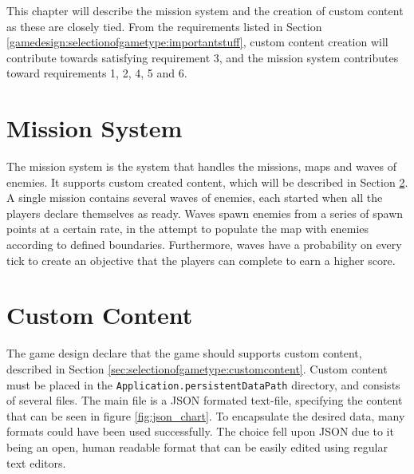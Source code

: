 This chapter will describe the mission system and the creation of custom content as these are closely tied.
From the requirements listed in Section \ref{gamedesign:selectionofgametype:importantstuff}, custom content creation will contribute towards satisfying requirement 3, and the mission system contributes toward requirements 1, 2, 4, 5 and 6.

\section{Mission System}
The mission system is the system that handles the missions, maps and waves of enemies.
It supports custom created content, which will be described in Section \ref{sec:modules:missions:customcontent}.
A single mission contains several waves of enemies, each started when all the players declare themselves as ready.
Waves spawn enemies from a series of spawn points at a certain rate, in the attempt to populate the map with enemies according to defined boundaries.
Furthermore, waves have a probability on every tick to create an objective that the players can complete to earn a higher score.

\section{Custom Content}\label{sec:modules:missions:customcontent}
The game design declare that the game should supports custom content, described in Section \ref{sec:selectionofgametype:customcontent}.
Custom content must be placed in the \lstinline|Application.persistentDataPath| directory, and consists of several files.
The main file is a JSON formated text-file, specifying the content that can be seen in figure \ref{fig:json_chart}.
To encapsulate the desired data, many formats could have been used successfully.
The choice fell upon JSON due to it being an open, human readable format that can be easily edited using regular text editors.


